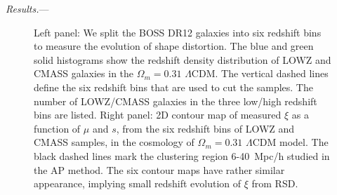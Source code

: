 \documentclass[prl,twocolumn,superscriptaddress,aps,amsmath,amssymb,nofootinbib,altaffilletter]{revtex4}
\begin{document}
{\it Results.}---

\begin{figure}
   \caption{\label{fig_TpCF}
   Left panel: We split the BOSS DR12 galaxies into six redshift bins to measure the evolution of shape distortion.
   The blue and green solid histograms show the redshift density distribution of LOWZ and CMASS galaxies in the $\Omega_m=0.31$ $\Lambda$CDM. 
   The vertical dashed lines define the six redshift bins that are used to cut the samples.
   The number of LOWZ/CMASS galaxies in the three low/high redshift bins are listed.
   Right panel: 2D contour map of measured $\xi$ as a function of $\mu$ and $s$, from the six redshift bins of LOWZ and CMASS samples, 
      in the cosmology of $\Omega_m=0.31$ $\Lambda$CDM model.
    The black dashed lines mark the clustering region 6-40\ Mpc/h studied in the AP method.
    The six contour maps have rather similar appearance, implying small redshift evolution of $\xi$ from RSD.
   }
\end{figure}
\end{document}
